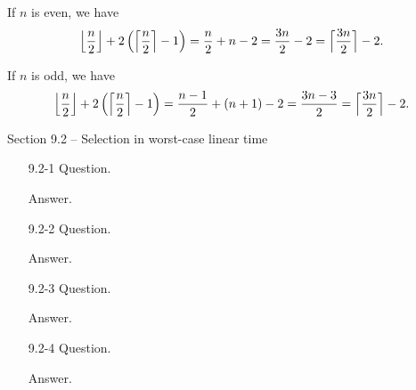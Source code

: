 \begin{enumerate}
\begin{framed}
If $n$ is even, we have
\[
  \Bigl\lfloor \frac{n}{2} \Bigr\rfloor + 2 \left( \Bigl\lceil \frac{n}{2} \Bigr\rceil - 1 \right)
  = \frac{n}{2} + n - 2
  = \frac{3n}{2} - 2
  = \Bigl\lceil \frac{3n}{2} \Bigr\rceil - 2.
\]

If $n$ is odd, we have
\[
  \Bigl\lfloor \frac{n}{2} \Bigr\rfloor + 2 \left( \Bigl\lceil \frac{n}{2} \Bigr\rceil - 1 \right)
  = \frac{n - 1}{2} + (n + 1) - 2
  = \frac{3n - 3}{2}
  = \Bigl\lceil \frac{3n}{2} \Bigr\rceil - 2.
\]
\end{framed}

\end{enumerate}

\newpage

{\large Section 9.2 {--} Selection in worst-case linear time}

\begin{enumerate}

\item[9.2-1]{Question.}

\begin{framed}
Answer.
\end{framed}

\item[9.2-2]{Question.}

\begin{framed}
Answer.
\end{framed}

\item[9.2-3]{Question.}

\begin{framed}
Answer.
\end{framed}

\item[9.2-4]{Question.}

\begin{framed}
Answer.
\end{framed}

\end{enumerate}
